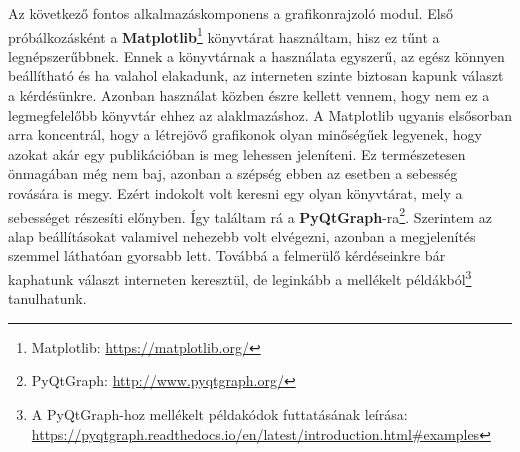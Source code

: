 \documentclass[12pt,a4paper]{article}
\begin{document}
      Az következő fontos alkalmazáskomponens a grafikonrajzoló modul. Első próbálkozásként a \textbf{Matplotlib}\footnote{Matplotlib: \url{https://matplotlib.org/}} könyvtárat használtam, hisz ez tűnt a legnépszerűbbnek. Ennek a könyvtárnak a használata egyszerű, az egész könnyen beállítható és ha valahol elakadunk, az interneten szinte biztosan kapunk választ a kérdésünkre. Azonban használat közben észre kellett vennem, hogy nem ez a legmegfelelőbb könyvtár ehhez az alaklmazáshoz. A Matplotlib ugyanis elsősorban arra koncentrál, hogy a létrejövő grafikonok olyan minőségűek legyenek, hogy azokat akár egy publikációban is meg lehessen jeleníteni. Ez természetesen önmagában még nem baj, azonban a szépség ebben az esetben a sebesség rovására is megy. Ezért indokolt volt keresni egy olyan könyvtárat, mely a sebességet részesíti előnyben. Így találtam rá a \textbf{PyQtGraph}-ra\footnote{PyQtGraph: \url{http://www.pyqtgraph.org/}}. Szerintem az alap beállításokat valamivel nehezebb volt elvégezni, azonban a megjelenítés szemmel láthatóan gyorsabb lett. Továbbá a felmerülő kérdéseinkre bár kaphatunk választ interneten keresztül, de leginkább a mellékelt példákból\footnote{A PyQtGraph-hoz mellékelt példakódok futtatásának leírása: \url{https://pyqtgraph.readthedocs.io/en/latest/introduction.html\#examples}} tanulhatunk.
\end{document}
